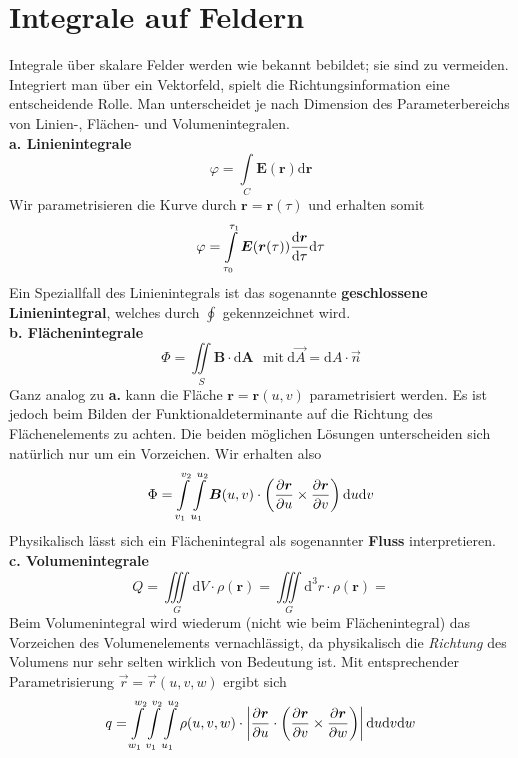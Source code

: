 \section{Integrale auf Feldern}
Integrale über skalare Felder werden wie bekannt bebildet; sie sind zu vermeiden.\\
Integriert man über ein Vektorfeld, spielt die Richtungsinformation eine entscheidende Rolle. Man unterscheidet je nach Dimension des Parameterbereichs von Linien-, Flächen- und Volumenintegralen.\\
\linebreak
\textbf{a. Linienintegrale}\\
\begin{equation*}
\varphi=\int\limits_{C}\bm{E}(\bm{r})\mathrm{d}\bm{r}
\end{equation*}
Wir parametrisieren die Kurve durch $\bm{r}=\bm{r}(\tau)$ und erhalten somit
\begin{equation*}
\varphi=\int\limits_{\tau_0}^{\tau_1}\bm{E}(\bm{r}(\tau))\frac{\mathrm{d}{\bm{r}}}{\mathrm{d}{\tau}}\mathrm{d}\tau
\end{equation*}
Ein Speziallfall des Linienintegrals ist das sogenannte \textbf{geschlossene Linienintegral}, welches durch $\oint$ gekennzeichnet wird.\\
\linebreak
\textbf{b. Flächenintegrale}\\
\begin{equation*}
\Phi=\iint\limits_{S}\bm{B}\cdot\mathrm{d}\bm{A} \ \ \ \mathrm{mit\ } \mathrm{d}\vec{A}=\mathrm{d}A\cdot\vec{n}
\end{equation*}
Ganz analog zu \textbf{a.} kann die Fläche $\bm{r}=\bm{r}(u,v)$ parametrisiert werden. Es ist jedoch beim Bilden der Funktionaldeterminante auf die Richtung des Flächenelements zu achten. Die beiden möglichen Lösungen unterscheiden sich natürlich nur um ein Vorzeichen. Wir erhalten also
\begin{equation*}
\Phi=\int\limits_{v_1}^{v_2}\int\limits_{u_1}^{u_2}\bm{B}(u,v)\cdot\left(\frac{\partial{\bm{r}}}{\partial{u}}\times\frac{\partial{\bm{r}}}{\partial{v}}\right)\mathrm{d}u\mathrm{d}v
\end{equation*}
Physikalisch lässt sich ein Flächenintegral als sogenannter \textbf{Fluss} interpretieren.\\
\linebreak
\textbf{c. Volumenintegrale}\\
\linebreak
\begin{equation*}
Q=\iiint\limits_G\mathrm{d}V\cdot\rho(\bm{r})=\iiint\limits_G\mathrm{d}^3r\cdot\rho(\bm{r})=
\end{equation*}
Beim Volumenintegral wird wiederum (nicht wie beim Flächenintegral) das Vorzeichen des Volumenelements vernachlässigt, da physikalisch die \emph{Richtung} des Volumens nur sehr selten wirklich von Bedeutung ist. Mit entsprechender Parametrisierung $\vec{r}=\vec{r}(u,v,w)$ ergibt sich
\begin{equation*}
q=\int\limits_{w_1}^{w_2}\int\limits_{v_1}^{v_2}\int\limits_{u_1}^{u_2}\rho(u,v,w)\cdot\left|\frac{\partial{\bm{r}}}{\partial{u}}\cdot\left(\frac{\partial{\bm{r}}}{\partial{v}}\times\frac{\partial{\bm{r}}}{\partial{w}}\right)\right|\mathrm{d}u\mathrm{d}v\mathrm{d}w
\end{equation*}
